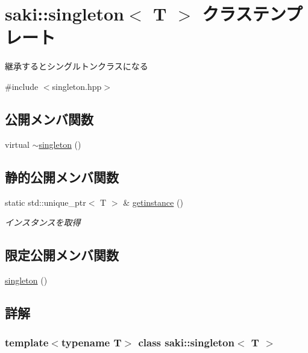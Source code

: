 \hypertarget{classsaki_1_1singleton}{}\section{saki\+:\+:singleton$<$ T $>$ クラステンプレート}
\label{classsaki_1_1singleton}


継承するとシングルトンクラスになる  




{\ttfamily \#include $<$singleton.\+hpp$>$}

\subsection*{公開メンバ関数}
\begin{DoxyCompactItemize}
\item 
virtual \mbox{\hyperlink{classsaki_1_1singleton_a7e18a317dec7a4658f6d3376f2dd3ebd}{$\sim$singleton}} ()
\end{DoxyCompactItemize}
\subsection*{静的公開メンバ関数}
\begin{DoxyCompactItemize}
\item 
static std\+::unique\+\_\+ptr$<$ T $>$ \& \mbox{\hyperlink{classsaki_1_1singleton_a17071f9daca33c8dd4287dffc49457ec}{getinstance}} ()
\begin{DoxyCompactList}\small\item\em インスタンスを取得 \end{DoxyCompactList}\end{DoxyCompactItemize}
\subsection*{限定公開メンバ関数}
\begin{DoxyCompactItemize}
\item 
\mbox{\hyperlink{classsaki_1_1singleton_a511f5d5e51fdac173fa0dbea858f5ee0}{singleton}} ()
\end{DoxyCompactItemize}


\subsection{詳解}
\subsubsection*{template$<$typename T$>$\newline
class saki\+::singleton$<$ T $>$}

